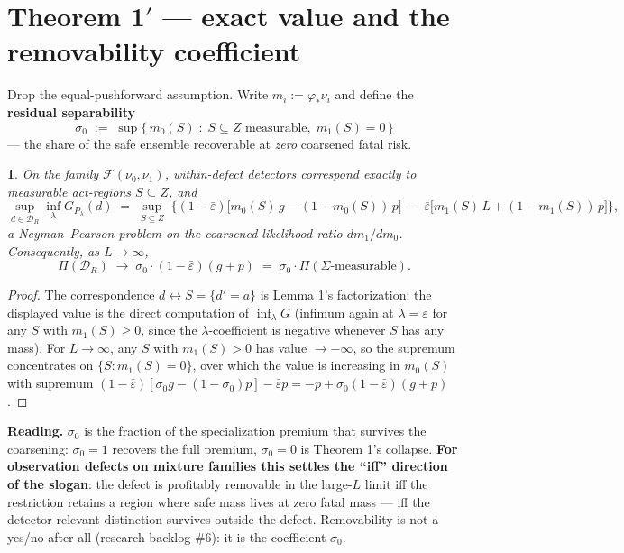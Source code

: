 \documentclass[11pt]{article}
\theoremstyle{plain}
\newtheorem*{namedthminner}{\namedthmname}
\newenvironment{nthm}[1]{\def\namedthmname{#1}\begin{namedthminner}}{\end{namedthminner}}
\theoremstyle{definition}
\newcommand{\prm}{\texorpdfstring{$'$}{'}}
\begin{document}
\section{Theorem 1\prm{} --- exact value and the removability coefficient}\label{app:thm1prime}

Drop the equal-pushforward assumption. Write $m_i := \varphi_* \nu_i$ and
define the \textbf{residual separability}
$$\sigma_0 \;:=\; \sup\{\, m_0(S) \;:\; S \subseteq Z \text{ measurable},\; m_1(S) = 0 \,\}$$
--- the share of the safe ensemble recoverable at \emph{zero} coarsened fatal risk.

\begin{nthm}{Theorem 1$'$}
On the family $\mathcal{F}(\nu_0,\nu_1)$, within-defect
detectors correspond exactly to measurable act-regions $S \subseteq Z$, and
$$\sup_{d \in \mathcal{D}_R} \inf_{\lambda} G_{P_\lambda}(d) \;=\; \sup_{S \subseteq Z}\; \Big\{ (1-\bar\varepsilon)\big[m_0(S)\,g - (1{-}m_0(S))\,p\big] \;-\; \bar\varepsilon\big[m_1(S)\,L + (1{-}m_1(S))\,p\big] \Big\},$$
a Neyman--Pearson problem on the coarsened likelihood ratio $dm_1/dm_0$.
Consequently, as $L \to \infty$,
$$\Pi(\mathcal{D}_R) \;\longrightarrow\; \sigma_0 \cdot (1-\bar\varepsilon)(g+p) \;=\; \sigma_0 \cdot \Pi(\Sigma\text{-measurable}).$$
\end{nthm}

\begin{proof}
The correspondence $d \leftrightarrow S = \{d' = a\}$ is Lemma 1's
factorization; the displayed value is the direct computation of
$\inf_\lambda G$ (infimum again at $\lambda = \bar\varepsilon$ for any $S$
with $m_1(S) \geq 0$, since the $\lambda$-coefficient is negative whenever
$S$ has any mass). For $L \to \infty$, any $S$ with $m_1(S) > 0$ has value
$\to -\infty$, so the supremum concentrates on $\{S : m_1(S) = 0\}$, over
which the value is increasing in $m_0(S)$ with supremum
$(1-\bar\varepsilon)[\sigma_0 g - (1-\sigma_0)p] - \bar\varepsilon p = -p + \sigma_0(1-\bar\varepsilon)(g+p)$.
\end{proof}

\textbf{Reading.} $\sigma_0$ is the fraction of the specialization premium that
survives the coarsening: $\sigma_0 = 1$ recovers the full premium,
$\sigma_0 = 0$ is Theorem 1's collapse. \textbf{For observation defects on mixture
families this settles the ``iff'' direction of the slogan}: the defect is
profitably removable in the large-$L$ limit iff the restriction retains a
region where safe mass lives at zero fatal mass --- iff the detector-relevant
distinction survives outside the defect. Removability is not a yes/no after
all (research backlog \#6): it is the coefficient $\sigma_0$.
\end{document}
